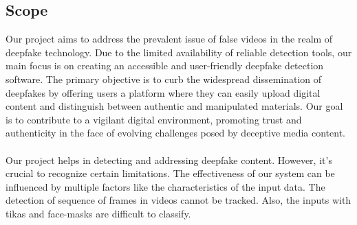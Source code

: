\subsection{Scope}

Our project aims to address the prevalent issue of false videos in the realm of deepfake technology. Due to the limited availability of reliable detection tools, our main focus is on creating an accessible and user-friendly deepfake detection software. The primary objective is to curb the widespread dissemination of deepfakes by offering users a platform where they can easily upload digital content and distinguish between authentic and manipulated materials. Our goal is to contribute to a vigilant digital environment, promoting trust and authenticity in the face of evolving challenges posed by deceptive media content.
\\\\
Our project helps in detecting and addressing deepfake content. However, it's crucial to recognize certain limitations. The effectiveness of our system  can be influenced by multiple factors like the characteristics of the input data. The detection of sequence of frames in videos cannot be tracked. Also, the inputs with tikas and face-masks are difficult to classify. 
\newpage